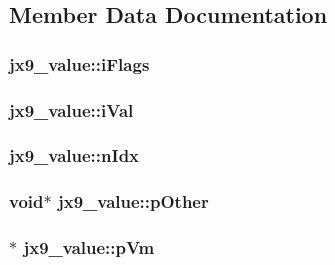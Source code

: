 \subsection{Member Data Documentation}
\hypertarget{structjx9__value_a3b4ce29d2307cb6338074a340d856d70}{
\subsubsection[{i\-Flags}]{ jx9\-\_\-value\-::i\-Flags}}\label{dc/d7b/structjx9__value_a3b4ce29d2307cb6338074a340d856d70}
\hypertarget{structjx9__value_ad9f0f5bcb14d09988738d7ee64fe1e19}{
\subsubsection[{i\-Val}]{ jx9\-\_\-value\-::i\-Val}}\label{dc/d7b/structjx9__value_ad9f0f5bcb14d09988738d7ee64fe1e19}
\hypertarget{structjx9__value_acc4573adda08561bbc81010e86140d09}{
\subsubsection[{n\-Idx}]{ jx9\-\_\-value\-::n\-Idx}}\label{dc/d7b/structjx9__value_acc4573adda08561bbc81010e86140d09}
\hypertarget{structjx9__value_a101f0ff59b0e4de3da69b3b9b91e0598}{
\subsubsection[{p\-Other}]{\setlength{\rightskip}{0pt plus 5cm}void$\ast$ jx9\-\_\-value\-::p\-Other}}\label{dc/d7b/structjx9__value_a101f0ff59b0e4de3da69b3b9b91e0598}
\hypertarget{structjx9__value_a6e0e7ebebfc576fecc9b8131d0672a7e}{
\subsubsection[{p\-Vm}]{$\ast$ jx9\-\_\-value\-::p\-Vm}}\label{dc/d7b/structjx9__value_a6e0e7ebebfc576fecc9b8131d0672a7e}
